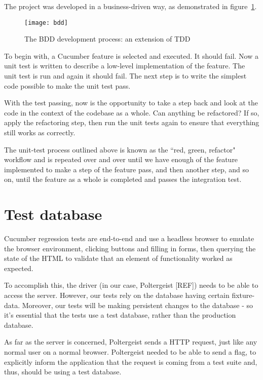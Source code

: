 The project was developed in a business-driven way, as demonstrated in figure~\ref{uml:bdd}.

\begin{figure}[h!]
  \centering
    \ifimages
    \texttt{[image: bdd]}
    \fi
  \caption{The BDD development process: an extension of TDD}
  \label{uml:bdd}
\end{figure}

To begin with, a Cucumber feature is selected and executed. It should fail. Now a unit test is written to describe a low-level implementation of the feature. The unit test is run and again it should fail. The next step is to write the simplest code possible to make the unit test pass.

With the test passing, now is the opportunity to take a step back and look at the code in the context of the codebase as a whole. Can anything be refactored? If so, apply the refactoring step, then run the unit tests again to ensure that everything still works as correctly.

The unit-test process outlined above is known as the ``red, green, refactor" workflow and is repeated over and over until we have enough of the feature implemented to make a step of the feature pass, and then another step, and so on, until the feature as a whole is completed and passes the integration test.

\section{Test database}

Cucumber regression tests are end-to-end and use a headless browser to emulate the browser environment, clicking buttons and filling in forms, then querying the state of the HTML to validate that an element of functionality worked as expected.

To accomplish this, the driver (in our case, Poltergeist [REF]) needs to be able to access the server. However, our tests rely on the database having certain fixture-data. Moreover, our tests will be making persistent changes to the database - so it's essential that the tests use a test database, rather than the production database.

As far as the server is concerned, Poltergeist sends a HTTP request, just like any normal user on a normal browser. Poltergeist needed to be able to send a flag, to explicitly inform the application that the request is coming from a test suite and, thus, should be using a test database.

